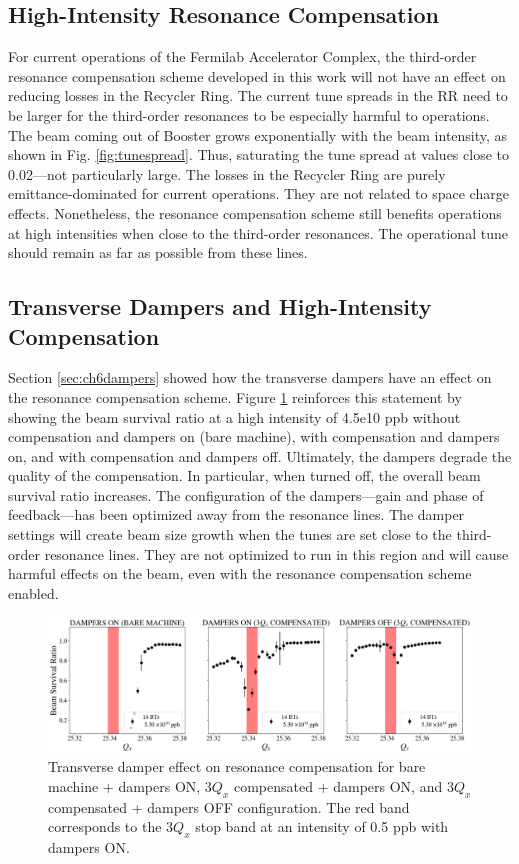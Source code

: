 \subsection{High-Intensity Resonance Compensation}

For current operations of the Fermilab Accelerator Complex, the third-order resonance compensation scheme developed in this work will not have an effect on reducing losses in the Recycler Ring. The current tune spreads in the RR need to be larger for the third-order resonances to be especially harmful to operations. The beam coming out of Booster grows exponentially with the beam intensity, as shown in Fig. \ref{fig:tunespread}. Thus, saturating the tune spread at values close to 0.02---not particularly large. The losses in the Recycler Ring are purely emittance-dominated for current operations. They are not related to space charge effects. Nonetheless, the resonance compensation scheme still benefits operations at high intensities when close to the third-order resonances. The operational tune should remain as far as possible from these lines.  

\subsection{Transverse Dampers and High-Intensity Compensation}

Section \ref{sec:ch6dampers} showed how the transverse dampers have an effect on the resonance compensation scheme. Figure \ref{fig:dampers7} reinforces this statement by showing the beam survival ratio at a high intensity of 4.5e10 ppb without compensation and dampers on (bare machine), with compensation and dampers on, and with compensation and dampers off. Ultimately, the dampers degrade the quality of the compensation. In particular, when turned off, the overall beam survival ratio increases. The configuration of the dampers---gain and phase of feedback---has been optimized away from the resonance lines. The damper settings will create beam size growth when the tunes are set close to the third-order resonance lines. They are not optimized to run in this region and will cause harmful effects on the beam, even with the resonance compensation scheme enabled.

\begin{figure}[H]
    \centering
    \includegraphics[width=\columnwidth]{chapter7/dampers_config.png}
    \caption{Transverse damper effect on resonance compensation for bare machine + dampers ON, $3Q_x$ compensated + dampers ON, and $3Q_x$ compensated + dampers OFF configuration. The red band corresponds to the $3Q_x$ stop band at an intensity of 0.5 ppb with dampers ON.}
    \label{fig:dampers7}
   \vspace{-1.25em}
\end{figure}


